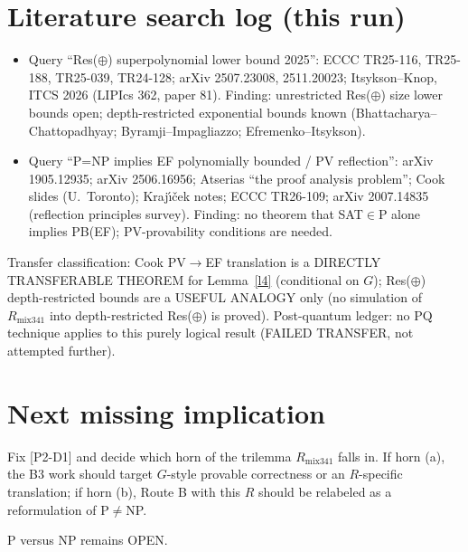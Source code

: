 \documentclass[11pt]{article}
\theoremstyle{definition}
\begin{document}
\section{Literature search log (this run)}
\begin{itemize}
\item Query ``Res($\oplus$) superpolynomial lower bound 2025'': ECCC TR25-116, TR25-188, TR25-039, TR24-128; arXiv 2507.23008, 2511.20023; Itsykson--Knop, ITCS 2026 (LIPIcs 362, paper 81). Finding: unrestricted Res($\oplus$) size lower bounds open; depth-restricted exponential bounds known (Bhattacharya--Chattopadhyay; Byramji--Impagliazzo; Efremenko--Itsykson).
\item Query ``P=NP implies EF polynomially bounded / PV reflection'': arXiv 1905.12935; arXiv 2506.16956; Atserias ``the proof analysis problem''; Cook slides (U.~Toronto); Kraj\'\i\v{c}ek notes; ECCC TR26-109; arXiv 2007.14835 (reflection principles survey). Finding: no theorem that SAT$\in$P alone implies PB(EF); PV-provability conditions are needed.
\end{itemize}
Transfer classification: Cook PV$\to$EF translation is a DIRECTLY TRANSFERABLE THEOREM for
Lemma~\ref{l4} (conditional on $G$); Res($\oplus$) depth-restricted bounds are a USEFUL
ANALOGY only (no simulation of $R_{\mathrm{mix341}}$ into depth-restricted Res($\oplus$) is proved).
Post-quantum ledger: no PQ technique applies to this purely logical result (FAILED TRANSFER, not attempted further).

\section{Next missing implication}
Fix [P2-D1] and decide which horn of the trilemma $R_{\mathrm{mix341}}$ falls in. If horn (a), the
B3 work should target $G$-style provable correctness or an $R$-specific translation; if horn (b),
Route B with this $R$ should be relabeled as a reformulation of P$\ne$NP.

P versus NP remains OPEN.
\end{document}
